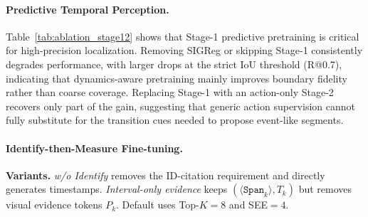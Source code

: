 \documentclass{article}
\theoremstyle{plain}
\theoremstyle{definition}
\theoremstyle{remark}
\begin{document}
\paragraph{Predictive Temporal Perception.}
Table~\ref{tab:ablation_stage12} shows that Stage-1 predictive pretraining is critical for high-precision localization.
Removing SIGReg or skipping Stage-1 consistently degrades performance, with larger drops at the strict IoU threshold (R@0.7), indicating that dynamics-aware pretraining mainly improves boundary fidelity rather than coarse coverage.
Replacing Stage-1 with an action-only Stage-2 recovers only part of the gain, suggesting that generic action supervision cannot fully substitute for the transition cues needed to propose event-like segments.

\paragraph{Identify-then-Measure Fine-tuning.}
\label{sec:ablation_stage3}

\begin{table}[t]
\centering
\caption{\textbf{Ablations on evidence-driven Identify-then-Measure fine-tuning (Stage-3).}}
\label{tab:ablation_stage3}


\vspace{2pt}
\footnotesize
\parbox{\columnwidth}{\textbf{Variants.}
\textit{w/o Identify} removes the ID-citation requirement and directly generates timestamps.
\textit{Interval-only evidence} keeps $(\langle\texttt{Span}_k\rangle, T_k)$ but removes visual evidence tokens $P_k$.
Default uses Top-$K{=}8$ and SEE$=4$.}
\vskip -0.1in
\end{table}
\end{document}
